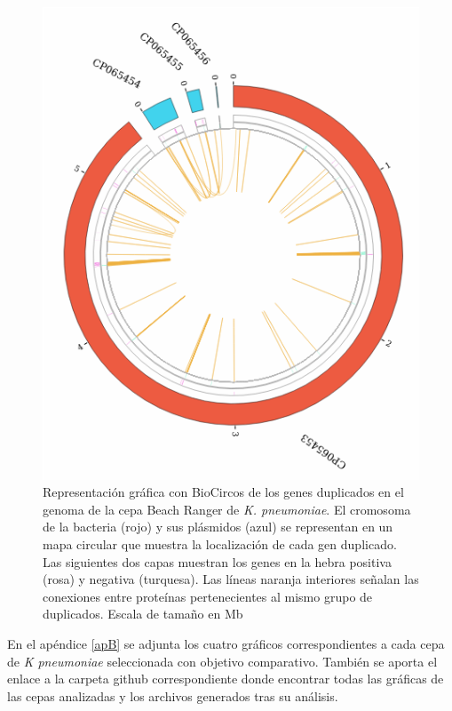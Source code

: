 \begin{figure}[h]
	\centering
	\captionsetup{width=\linewidth} 
	\includegraphics[width=\linewidth]{figs/biocircos_BeachRanger.png}
	\caption[Gráfica biocircos para la cepa Beach Ranger de \textit{K. pneumoniae}]{Representación gráfica con BioCircos de los genes duplicados en el genoma de la cepa Beach Ranger de \textit{K. pneumoniae}. El cromosoma de la bacteria (rojo) y sus plásmidos (azul) se representan en un mapa circular que muestra la localización de cada gen duplicado. Las siguientes dos capas muestran los genes en la hebra positiva (rosa) y negativa (turquesa). Las líneas naranja interiores señalan las conexiones entre proteínas pertenecientes al mismo grupo de duplicados. Escala de tamaño en Mb}
	\label{fig:biobeach}
\end{figure}

En el apéndice \ref{apB} se adjunta los cuatro gráficos correspondientes a cada cepa de \textit{K pneumoniae} seleccionada con objetivo comparativo. También se aporta el enlace a la carpeta github correspondiente donde encontrar todas las gráficas de las cepas analizadas y los archivos generados tras su análisis.